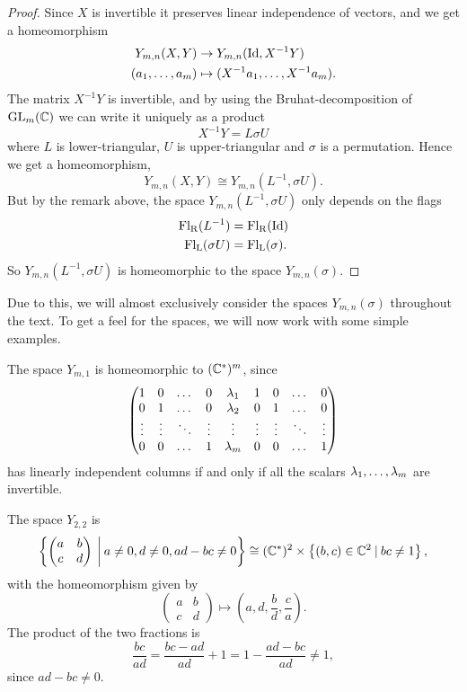 \begin{proof}
  Since $X$ is invertible it preserves linear independence of vectors,
  and we get a homeomorphism
  \begin{align*}
    Y_{m,n}(X,Y) &\to Y_{m,n}(\operatorname{Id},X^{-1}Y) \\
    (a_1,\dots,a_m) &\mapsto (X^{-1}a_1,\dots,X^{-1}a_m).
  \end{align*}
  The matrix $X^{-1}Y$ is invertible, and by using the
  Bruhat-decomposition of $\operatorname{GL}_m(\mathbb{C})$ we can write it uniquely as a
  product 
  \[ X^{-1}Y = L\sigma U \]
  where $L$ is lower-triangular, $U$ is upper-triangular and $\sigma$
  is a permutation. Hence we get a homeomorphism,
  \[ Y_{m,n}(X,Y) \cong Y_{m,n}(L^{-1}, \sigma U). \]
  But by the remark above, the space $Y_{m,n}(L^{-1},\sigma U)$ only
  depends
  on the flags 
  \begin{align*}
    \mathrm{Fl_R}(L^{-1}) &= \mathrm{Fl_R}(\operatorname{Id}) \\
    \mathrm{Fl_L}(\sigma U) &= \mathrm{Fl_L}(\sigma).
  \end{align*}
  So $Y_{m,n}(L^{-1},\sigma U)$ is homeomorphic to the space $Y_{m,n}(\sigma)$.
\end{proof}

Due to this, we will almost exclusively consider the spaces
$Y_{m,n}(\sigma)$ throughout the text. To get a feel for the spaces,
we will now work with some simple examples.

\begin{example}
  \label{ex:n=1}
  The space $Y_{m,1}$ is homeomorphic to $(\mathbb{C}^*)^m$, since
  \[\begin{pmatrix}
    1&0&\dots&0&\lambda_1&1&0&\dots&0 \\
    0&1&\dots&0&\lambda_2&0&1&\dots&0 \\
    \vdots&\vdots&\ddots&\vdots&\vdots&\vdots&\vdots&\ddots&\vdots \\
    0&0&\dots&1&\lambda_m&0&0&\dots&1
  \end{pmatrix} \]
  has linearly independent columns if and only if all the scalars
  $\lambda_1,\dots,\lambda_m$ are invertible.
\end{example}

\begin{example}
  The space $Y_{2,2}$ is
  \[ \left\{ 
    \begin{pmatrix}
      a & b \\
      c & d
    \end{pmatrix} \:\bigg\vert\: a \neq 0, d \neq 0, ad-bc
    \neq 0  \right\} \cong (\mathbb{C}^*)^2 \times \left\{ (b,c)\in\mathbb{C}^2 \:\vert\:
    bc \neq 1 \right\}, \]
  with the homeomorphism given by
  \[
  \begin{pmatrix}
    a & b\\
    c & d
  \end{pmatrix} \mapsto \left(a,d,\frac{b}{d},\frac{c}{a}\right).\]
  The product of the two fractions is
  \[ \frac{bc}{ad} = \frac{bc-ad}{ad} + 1 = 1-\frac{ad-bc}{ad} \neq
  1, \]
  since $ad-bc \neq 0$.
\end{example}

